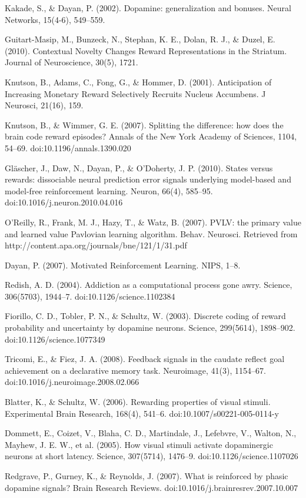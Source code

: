 Kakade, S., & Dayan, P. (2002). Dopamine: generalization and bonuses. Neural Networks, 15(4-6), 549–559.

Guitart-Masip, M., Bunzeck, N., Stephan, K. E., Dolan, R. J., & Duzel, E. (2010). Contextual Novelty Changes Reward Representations in the Striatum. Journal of Neuroscience, 30(5), 1721.

Knutson, B., Adams, C., Fong, G., & Hommer, D. (2001). Anticipation of Increasing Monetary Reward Selectively Recruits Nucleus Accumbens. J Neurosci, 21(16), 159.

Knutson, B., & Wimmer, G. E. (2007). Splitting the difference: how does the brain code reward episodes? Annals of the New York Academy of Sciences, 1104, 54–69. doi:10.1196/annals.1390.020

Gläscher, J., Daw, N., Dayan, P., & O'Doherty, J. P. (2010). States versus rewards: dissociable neural prediction error signals underlying model-based and model-free reinforcement learning. Neuron, 66(4), 585–95. doi:10.1016/j.neuron.2010.04.016

O'Reilly, R., Frank, M. J., Hazy, T., & Watz, B. (2007). PVLV: the primary value and learned value Pavlovian learning algorithm. Behav. Neurosci. Retrieved from http://content.apa.org/journals/bne/121/1/31.pdf

Dayan, P. (2007). Motivated Reinforcement Learning. NIPS, 1–8.

Redish, A. D. (2004). Addiction as a computational process gone awry. Science, 306(5703), 1944–7. doi:10.1126/science.1102384

Fiorillo, C. D., Tobler, P. N., & Schultz, W. (2003). Discrete coding of reward probability and uncertainty by dopamine neurons. Science, 299(5614), 1898–902. doi:10.1126/science.1077349

Tricomi, E., & Fiez, J. A. (2008). Feedback signals in the caudate reflect goal achievement on a declarative memory task. Neuroimage, 41(3), 1154–67. doi:10.1016/j.neuroimage.2008.02.066

Blatter, K., & Schultz, W. (2006). Rewarding properties of visual stimuli. Experimental Brain Research, 168(4), 541–6. doi:10.1007/s00221-005-0114-y

Dommett, E., Coizet, V., Blaha, C. D., Martindale, J., Lefebvre, V., Walton, N., Mayhew, J. E. W., et al. (2005). How visual stimuli activate dopaminergic neurons at short latency. Science, 307(5714), 1476–9. doi:10.1126/science.1107026

Redgrave, P., Gurney, K., & Reynolds, J. (2007). What is reinforced by phasic dopamine signals? Brain Research Reviews. doi:10.1016/j.brainresrev.2007.10.007

